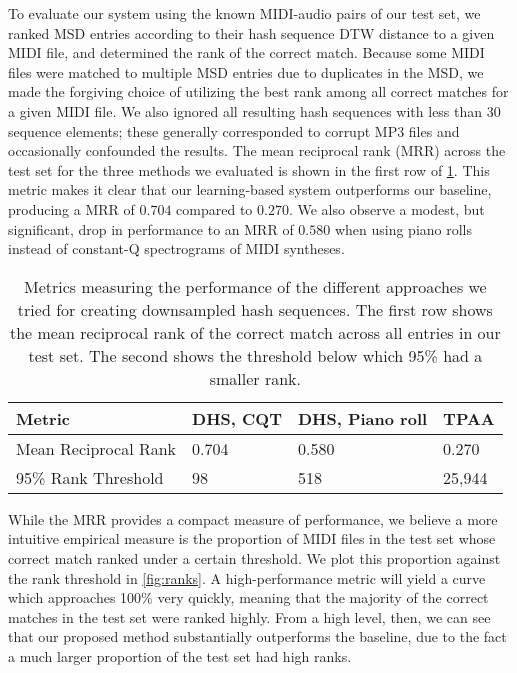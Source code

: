 To evaluate our system using the known MIDI-audio pairs of our test set, we ranked MSD entries according to their hash sequence DTW distance to a given MIDI file, and determined the rank of the correct match.
Because some MIDI files were matched to multiple MSD entries due to duplicates in the MSD, we made the forgiving choice of utilizing the best rank among all correct matches for a given MIDI file.
We also ignored all resulting hash sequences with less than 30 sequence elements; these generally corresponded to corrupt MP3 files and occasionally confounded the results.
The mean reciprocal rank (MRR) across the test set for the three methods we evaluated is shown in the first row of \cref{tab:ranking_metrics}.
This metric makes it clear that our learning-based system outperforms our baseline, producing a MRR of $0.704$ compared to $0.270$.
We also observe a modest, but significant, drop in performance to an MRR of $0.580$ when using piano rolls instead of constant-Q spectrograms of MIDI syntheses.

\begin{table}
  \begin{center}
    \begin{tabular}{l l l l}
      \toprule
      Metric & \textbf{DHS, CQT} & \textbf{DHS, Piano roll} & \textbf{TPAA} \\
      \midrule
      Mean Reciprocal Rank & 0.704 & 0.580 & 0.270 \\
      95\% Rank Threshold & 98 & 518 & 25,944 \\
      \bottomrule
    \end{tabular}
  \end{center}
  \caption{Metrics measuring the performance of the different approaches we tried for creating downsampled hash sequences.
The first row shows the mean reciprocal rank of the correct match across all entries in our test set.
The second shows the threshold below which 95\% had a smaller rank.}
  \label{tab:ranking_metrics}
\end{table}

While the MRR provides a compact measure of performance, we believe a more intuitive empirical measure is the proportion of MIDI files in the test set whose correct match ranked under a certain threshold.
We plot this proportion against the rank threshold in \cref{fig:ranks}.
A high-performance metric will yield a curve which approaches 100\% very quickly, meaning that the majority of the correct matches in the test set were ranked highly.
From a high level, then, we can see that our proposed method substantially outperforms the baseline, due to the fact a much larger proportion of the test set had high ranks.

